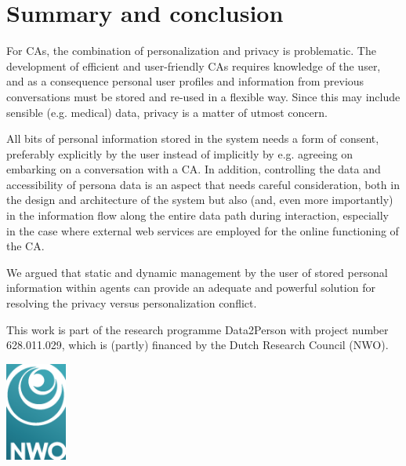 \documentclass[sigchi-a,nonacm]{acmart}
\begin{document}
\section{Summary and conclusion} 
For CAs, the combination of personalization and privacy is problematic. The development of efficient and user-friendly CAs requires knowledge of the user, and as a consequence personal user profiles and information from previous conversations must be stored and re-used in a flexible way. Since this may include sensible (e.g. medical) data, privacy is a matter of utmost concern. 

All bits of personal information stored in the system needs a form of consent, preferably explicitly by the user instead of implicitly by e.g. agreeing on embarking on a conversation with a CA. In addition, controlling the data and accessibility of persona data is an aspect that needs careful consideration, both in the design and architecture of the system but also (and, even more importantly) in the information flow along the entire data path during interaction, especially in the case where external web services are employed for the online functioning of the CA.

We argued that static and dynamic management by the user of stored personal information within agents can provide an adequate and powerful solution for resolving the privacy versus personalization conflict.

\begin{acks}
This work is part of the research programme Data2Person with project number 628.011.029, which is (partly) financed by the Dutch Research Council (NWO). 
\begin{marginfigure}
    \includegraphics[width=20mm]{NWO-logo.png}
\end{marginfigure}
\end{acks}



\end{document}
